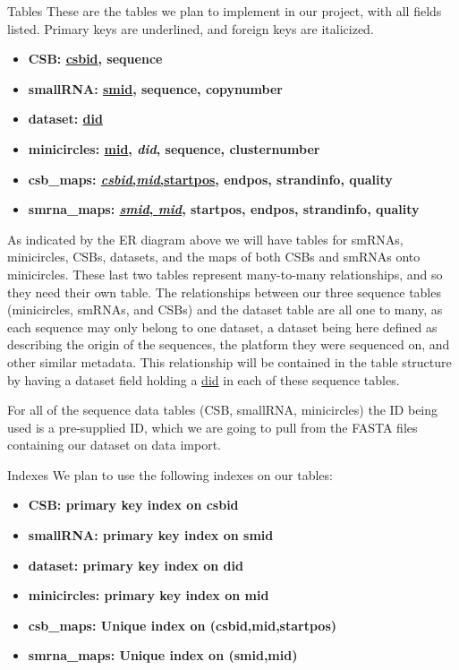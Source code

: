 \documentclass[a4paper,10pt,notitlepage]{article}
\begin{document}
\begin{section}{Tables}
    These are the tables we plan to implement in our project, with all fields listed. Primary keys are underlined,
    and foreign keys are italicized.

    \begin{itemize}
        \item \bfseries{CSB}: \underline{csbid}, sequence
        \item \bfseries{smallRNA}: \underline{smid}, sequence, copynumber
        \item \bfseries{dataset}: \underline{did}
        \item \bfseries{minicircles}: \underline{mid}, \textit{did}, sequence, clusternumber
        \item \bfseries{csb\_maps}: \underline{\textit{csbid},\textit{mid},startpos}, endpos, strandinfo, quality
        \item \bfseries{smrna\_maps}: \underline{\textit{smid}, \textit{mid}}, startpos, endpos, strandinfo, quality
    \end{itemize}
    
    As indicated by the ER diagram above we will have tables for smRNAs, minicircles, CSBs, datasets, and the maps of both 
    CSBs and smRNAs onto minicircles. These last two tables represent many-to-many relationships, and so they need their own 
    table. The relationships between our three sequence tables (minicircles, smRNAs, and CSBs) and the dataset table are all one to
    many, as each sequence may only belong to one dataset, a dataset being here defined as describing the origin of the sequences,
    the platform they were sequenced on, and other similar metadata. This relationship will be contained in the table structure 
    by having a dataset field holding a \underline{did} in each of these sequence tables. 

    For all of the sequence data tables (CSB, smallRNA, minicircles) the ID being used is a pre-supplied ID, which we are going
    to pull from the FASTA files containing our dataset on data import.

    \begin{subsection}{Indexes}
        We plan to use the following indexes on our tables:

        \begin{itemize}
            \item \bfseries{CSB}: primary key index on csbid
            \item \bfseries{smallRNA}: primary key index on smid
            \item \bfseries{dataset}: primary key index on did
            \item \bfseries{minicircles}: primary key index on mid
            \item \bfseries{csb\_maps}: Unique index on (csbid,mid,startpos)
            \item \bfseries{smrna\_maps}: Unique index on (smid,mid)
        \end{itemize}


\end{subsection}
\end{section}
\end{document}
